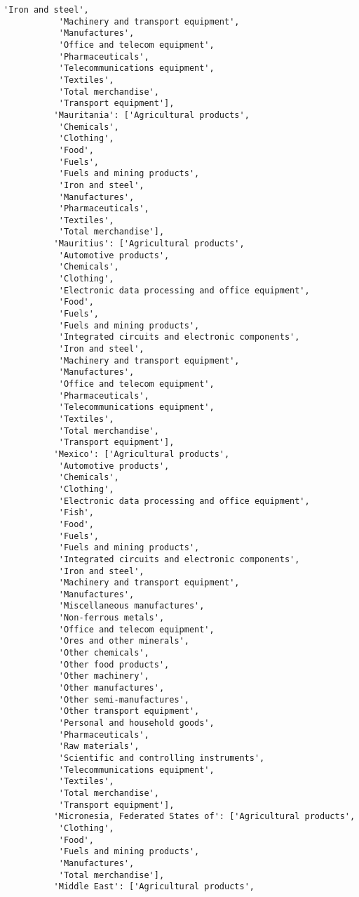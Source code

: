 \documentclass[11pt]{article}
\begin{document}
\begin{Verbatim}[commandchars=\\\{\}]
           'Iron and steel',
           'Machinery and transport equipment',
           'Manufactures',
           'Office and telecom equipment',
           'Pharmaceuticals',
           'Telecommunications equipment',
           'Textiles',
           'Total merchandise',
           'Transport equipment'],
          'Mauritania': ['Agricultural products',
           'Chemicals',
           'Clothing',
           'Food',
           'Fuels',
           'Fuels and mining products',
           'Iron and steel',
           'Manufactures',
           'Pharmaceuticals',
           'Textiles',
           'Total merchandise'],
          'Mauritius': ['Agricultural products',
           'Automotive products',
           'Chemicals',
           'Clothing',
           'Electronic data processing and office equipment',
           'Food',
           'Fuels',
           'Fuels and mining products',
           'Integrated circuits and electronic components',
           'Iron and steel',
           'Machinery and transport equipment',
           'Manufactures',
           'Office and telecom equipment',
           'Pharmaceuticals',
           'Telecommunications equipment',
           'Textiles',
           'Total merchandise',
           'Transport equipment'],
          'Mexico': ['Agricultural products',
           'Automotive products',
           'Chemicals',
           'Clothing',
           'Electronic data processing and office equipment',
           'Fish',
           'Food',
           'Fuels',
           'Fuels and mining products',
           'Integrated circuits and electronic components',
           'Iron and steel',
           'Machinery and transport equipment',
           'Manufactures',
           'Miscellaneous manufactures',
           'Non-ferrous metals',
           'Office and telecom equipment',
           'Ores and other minerals',
           'Other chemicals',
           'Other food products',
           'Other machinery',
           'Other manufactures',
           'Other semi-manufactures',
           'Other transport equipment',
           'Personal and household goods',
           'Pharmaceuticals',
           'Raw materials',
           'Scientific and controlling instruments',
           'Telecommunications equipment',
           'Textiles',
           'Total merchandise',
           'Transport equipment'],
          'Micronesia, Federated States of': ['Agricultural products',
           'Clothing',
           'Food',
           'Fuels and mining products',
           'Manufactures',
           'Total merchandise'],
          'Middle East': ['Agricultural products',

\end{Verbatim}
\end{document}
